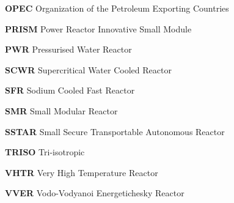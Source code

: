 \documentclass[journal]{IEEEtran}
\begin{document}
\textbf{OPEC} Organization of the Petroleum Exporting Countries\par
\textbf{PRISM} Power Reactor Innovative Small Module\par
\textbf{PWR} Pressurised Water Reactor\par
\textbf{SCWR} Supercritical Water Cooled Reactor\par
\textbf{SFR} Sodium Cooled Fast Reactor\par
\textbf{SMR} Small Modular Reactor\par
\textbf{SSTAR} Small Secure Transportable Autonomous Reactor\par
\textbf{TRISO} Tri-isotropic\par
\textbf{VHTR} Very High Temperature Reactor\par
\textbf{VVER} Vodo-Vodyanoi Energetichesky Reactor \par


%
%



%
%
\end{document}
